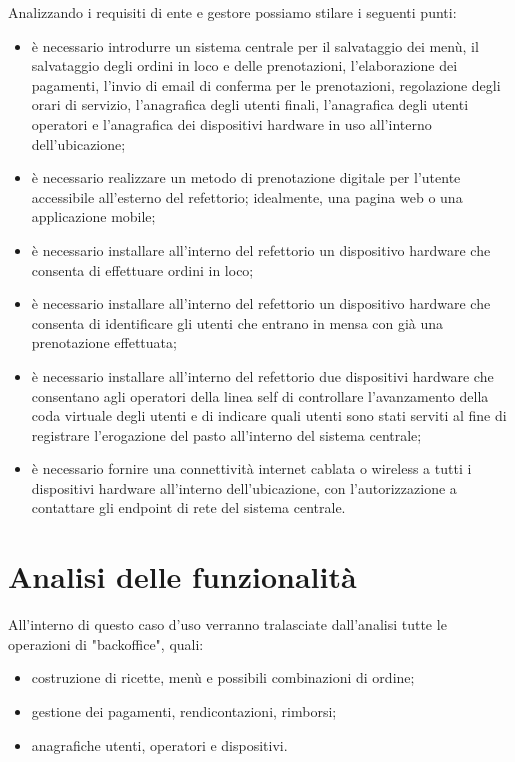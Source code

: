 \documentclass[a4paper, titlepage, 12pt, openright, twoside]{book}
\begin{document}
Analizzando i requisiti di ente e gestore possiamo stilare i seguenti punti:
\begin{itemize}
	\item è necessario introdurre un sistema centrale per il salvataggio dei menù, il salvataggio degli ordini in loco e delle prenotazioni,
		  l'elaborazione dei pagamenti, l'invio di email di conferma per le prenotazioni, regolazione degli orari di servizio, l'anagrafica degli utenti finali, l'anagrafica degli
		  utenti operatori e l'anagrafica dei dispositivi hardware in uso all'interno dell'ubicazione;
	\item è necessario realizzare un metodo di prenotazione digitale per l'utente accessibile all'esterno del refettorio; idealmente, una pagina web o una applicazione mobile;
	\item è necessario installare all'interno del refettorio un dispositivo hardware che consenta di effettuare ordini in loco;
	\item è necessario installare all'interno del refettorio un dispositivo hardware che consenta di identificare gli utenti che entrano in mensa con già una prenotazione effettuata;
	\item è necessario installare all'interno del refettorio due dispositivi hardware che consentano agli operatori della linea self di controllare l'avanzamento della coda virtuale degli utenti e di indicare quali utenti sono stati serviti al fine di registrare l'erogazione del pasto all'interno del sistema centrale;
	\item è necessario fornire una connettività internet cablata o wireless a tutti i dispositivi hardware all'interno dell'ubicazione, con l'autorizzazione a contattare gli endpoint di rete del sistema centrale.
\end{itemize}

\section{Analisi delle funzionalità}

All'interno di questo caso d'uso verranno tralasciate dall'analisi tutte le operazioni di "backoffice", quali:
\begin{itemize}
	\item costruzione di ricette, menù e possibili combinazioni di ordine;
	\item gestione dei pagamenti, rendicontazioni, rimborsi;
	\item anagrafiche utenti, operatori e dispositivi.
\end{itemize}
\end{document}
